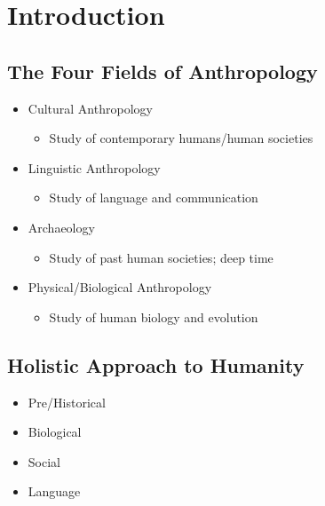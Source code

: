 \documentclass[a4paper]{article}
\begin{document}
\section{Introduction} %
\subsection{The Four Fields of Anthropology}
\begin{itemize}
  \item Cultural Anthropology
  \begin{itemize}
    \item Study of contemporary humans/human societies
  \end{itemize}

  \item Linguistic Anthropology
  \begin{itemize}
    \item Study of language and communication
  \end{itemize}

  \item Archaeology
  \begin{itemize}
    \item Study of past human societies; deep time
  \end{itemize}

  \item Physical/Biological Anthropology
  \begin{itemize}
    \item Study of human biology and evolution
  \end{itemize}
\end{itemize}

\subsection{Holistic Approach to Humanity}
\begin{itemize}
  \item Pre/Historical
  \item Biological
  \item Social
  \item Language
\end{itemize}
\end{document}
